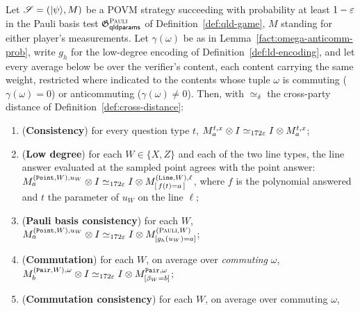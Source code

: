 \begin{lemma}
\label{lem:qld-win}
\leanok
Let $\mathscr{S} = (|\psi\rangle, M)$ be a POVM strategy succeeding with probability at least
$1 - \varepsilon$ in the Pauli basis test $\mathfrak{G}^{\textsc{Pauli}}_{\mathsf{qldparams}}$ of
Definition~\ref{def:qld-game}, $M$ standing for either player's measurements. Let
$\gamma(\omega)$ be as in
Lemma~\ref{fact:omega-anticomm-prob}, write $g_h$ for the low-degree encoding of
Definition~\ref{def:ld-encoding}, and let every average below be over the verifier's content,
each content carrying the same weight, restricted where indicated to the contents whose tuple
$\omega$ is commuting ($\gamma(\omega) = 0$) or anticommuting ($\gamma(\omega) \neq 0$). Then,
with $\simeq_\delta$ the cross-party distance of Definition~\ref{def:cross-distance}:
\begin{enumerate}
\item (\textbf{Consistency}) for every question type $t$,
  $M^{t,x}_a \otimes I \simeq_{172\varepsilon} I \otimes M^{t,x}_a$;
\item (\textbf{Low degree}) for each $W \in \{X, Z\}$ and each of the two line types, the line
  answer evaluated at the sampled point agrees with the point answer:
  $M^{(\mathtt{Point}, W), u_W}_a \otimes I \simeq_{172\varepsilon}
    I \otimes M^{(\mathtt{Line}, W), \ell}_{[\,f(t) = a\,]}$, where $f$ is the polynomial
  answered and $t$ the parameter of $u_W$ on the line $\ell$;
\item (\textbf{Pauli basis consistency}) for each $W$,
  $M^{(\mathtt{Point}, W), u_W}_a \otimes I \simeq_{172\varepsilon}
    I \otimes M^{(\textsc{Pauli}, W)}_{[g_h(u_W) = a]}$;
\item (\textbf{Commutation}) for each $W$, on average over \emph{commuting} $\omega$,
  $M^{(\mathtt{Pair}, W), \omega}_b \otimes I \simeq_{172\varepsilon}
    I \otimes M^{\mathtt{Pair}, \omega}_{[\beta_W = b]}$;
\item (\textbf{Commutation consistency}) for each $W$, on average over commuting $\omega$,

\end{enumerate}
\end{lemma}
